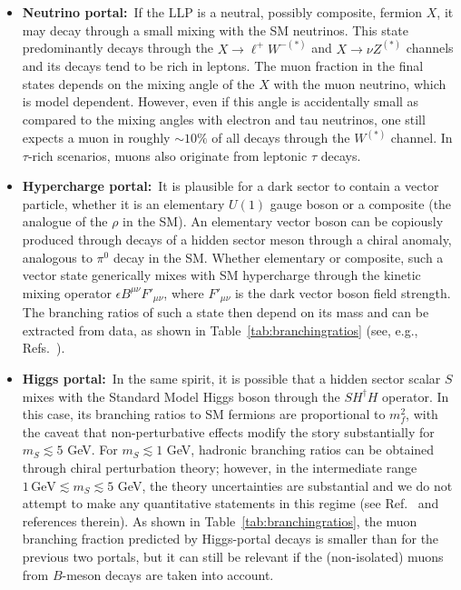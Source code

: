 \begin{itemize}
\item {\bf Neutrino portal:}~If the LLP is a neutral, possibly composite, fermion $X$, it may decay through a small mixing with the SM neutrinos. This state  predominantly decays through the $X\to \ell^+ W^{-(\ast)}$ and $X\to \nu Z^{(\ast)}$ channels and its decays tend to be rich in leptons. The muon fraction in the final states depends on the mixing angle of the $X$ with the muon neutrino, which is model dependent. However, even if this angle is accidentally small as compared to the mixing angles with electron and tau neutrinos, one still expects a muon in roughly $\sim10\%$ of all decays through the $W^{(\ast)}$ channel. In $\tau$-rich scenarios, muons also originate from leptonic $\tau$ decays.

\item {\bf Hypercharge portal:}~It is plausible for a dark sector to contain a vector particle, whether it is an elementary $U(1)$ gauge boson or a composite (the analogue of the $\rho$ in the SM). An elementary vector boson can be copiously produced through decays of a hidden sector meson through a chiral anomaly, analogous to $\pi^0$ decay in the SM.  Whether elementary or composite, such a vector state generically mixes with SM hypercharge through the kinetic mixing operator $\epsilon B^{\mu\nu}F'_{\mu\nu}$, where $F'_{\mu\nu}$ is the dark vector boson field strength. The branching ratios of such a state then depend on its mass and can be extracted from data, as shown in Table~\ref{tab:branchingratios} (see, e.g., Refs.~\cite{Meade:2009rb, Curtin:2014cca}).

\item {\bf Higgs portal:}~In the same spirit, it is possible that a hidden sector scalar $S$ mixes with the Standard Model Higgs boson through the $S H^\dagger H$ operator. In this case, its branching ratios to SM fermions are proportional to $m_f^2$, with the caveat that non-perturbative effects modify the story substantially for $m_S\lesssim 5$ GeV. For $m_S\lesssim 1$ GeV, hadronic branching ratios can be obtained through chiral perturbation theory; however, in the intermediate range $1\, \mathrm{GeV} \lesssim m_S \lesssim 5$ GeV, the theory uncertainties are substantial and we do not attempt to make any quantitative statements in this regime (see Ref.~\cite{Clarke:2013aya} and references therein). As shown in Table~\ref{tab:branchingratios}, the muon branching fraction predicted by Higgs-portal decays is smaller than for the previous two portals, but it can still be relevant if the (non-isolated) muons from $B$-meson decays are taken into account.


\end{itemize}
